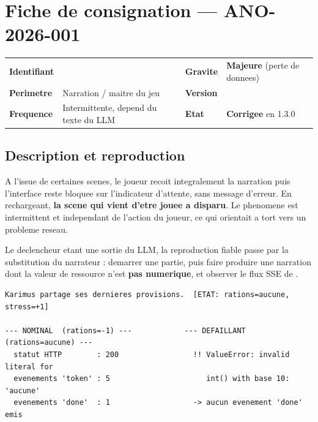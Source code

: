 \section{Fiche de consignation --- ANO-2026-001}
\label{sec:fiche}


\footnotesize
\begin{tabularx}{\linewidth}{@{}L{2.6cm} X L{2.4cm} L{3.2cm}@{}}
\toprule
\textbf{Identifiant} &  & \textbf{Gravite} & \textcolor{OrangeAlerte}{\textbf{Majeure}} (perte de donnees) \\
\textbf{Perimetre} & Narration / maitre du jeu & \textbf{Version} &  \\
\textbf{Frequence} & Intermittente, depend du texte du LLM & \textbf{Etat} & \textcolor{VertOk}{\textbf{Corrigee}} en 1.3.0 \\
\bottomrule
\end{tabularx}
\normalsize

\subsection{Description et reproduction}

A l'issue de certaines scenes, le joueur recoit integralement la narration puis l'interface reste
bloquee sur l'indicateur d'attente, sans message d'erreur. En rechargeant, \textbf{la scene qui
vient d'etre jouee a disparu}. Le phenomene est intermittent et independant de l'action du joueur,
ce qui orientait a tort vers un probleme reseau.

Le declencheur etant une sortie du LLM, la reproduction fiable passe par la substitution du
narrateur : demarrer une partie, puis faire produire une narration dont la valeur de ressource
n'est \textbf{pas numerique}, et observer le flux SSE de .

\begin{lstlisting}[style=sortie]
Karimus partage ses dernieres provisions.  [ETAT: rations=aucune, stress=+1]

--- NOMINAL  (rations=-1) ---            --- DEFAILLANT (rations=aucune) ---
  statut HTTP        : 200                 !! ValueError: invalid literal for
  evenements 'token' : 5                      int() with base 10: 'aucune'
  evenements 'done'  : 1                   -> aucun evenement 'done' emis
\end{lstlisting}


